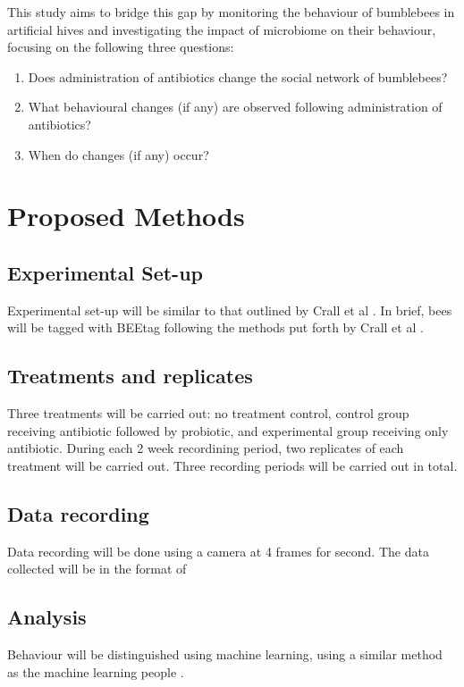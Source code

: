 \documentclass[11pt]{article}
\begin{document}
        This study aims to bridge this gap by monitoring the behaviour of bumblebees in artificial hives and investigating the impact of microbiome on their behaviour,
        focusing on the following three questions:
        \begin{enumerate}
            \item Does administration of antibiotics change the social network of bumblebees?
            \item What behavioural changes (if any) are observed following administration of antibiotics?
            \item When do changes (if any) occur?
        \end{enumerate}

    \section{Proposed Methods}
        \subsection{Experimental Set-up}
            Experimental set-up will be similar to that outlined by Crall et al
            \cite{crall2018neonicotinoid}.
            In brief, bees will be tagged with BEEtag following the methods put forth by Crall et al
            \cite{crall2015beetag}.

        \subsection{Treatments and replicates}
            Three treatments will be carried out: no treatment control,
            control group receiving antibiotic followed by probiotic,
            and experimental group receiving only antibiotic.
            During each 2 week recordining period,
            two replicates of each treatment will be carried out.
            Three recording periods will be carried out in total.

        \subsection{Data recording}
            Data recording will be done using a camera at 4 frames for second. The data collected will be in the format of 
            
        \subsection{Analysis}
            Behaviour will be distinguished using machine learning, using a similar method as the machine learning people
            \cite{blut2017automated}.
\end{document}
